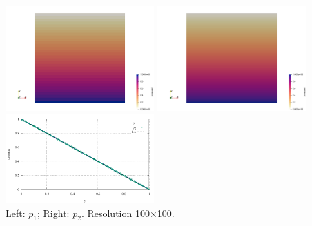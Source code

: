 \begin{center}
\includegraphics[width=5.7cm]{python_codes/fieldstone_119/results/exp1/p1}
\includegraphics[width=5.7cm]{python_codes/fieldstone_119/results/exp1/p2}
\includegraphics[width=5.7cm]{python_codes/fieldstone_119/results/exp1/profile.pdf}\\
{\captionfont Left: $p_1$; Right: $p_2$. Resolution 100$\times$100.}
\end{center}

